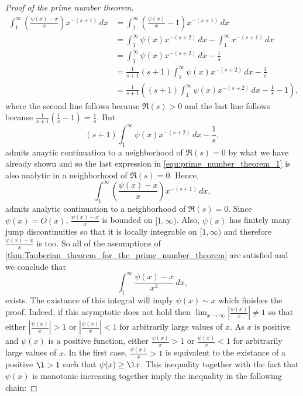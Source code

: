 \begin{proof}[Proof of the prime number theorem]
        \begin{equation}\label{equ:prime_number_theorem_1}
          \begin{aligned}
            \int_{1}^{\infty}\left(\frac{\psi(x)-x}{x}\right)x^{-(s+1)}\,dx &= \int_{1}^{\infty}\left(\frac{\psi(x)}{x}-1\right)x^{-(s+1)}\,dx \\
            &= \int_{1}^{\infty}\psi(x)x^{-(s+2)}\,dx-\int_{1}^{\infty}x^{-(s+1)}\,dx \\
            &= \int_{1}^{\infty}\psi(x)x^{-(s+2)}\,dx-\frac{1}{s} \\
            &= \frac{1}{s+1}(s+1)\int_{1}^{\infty}\psi(x)x^{-(s+2)}\,dx-\frac{1}{s} \\
            &= \frac{1}{s+1}\left((s+1)\int_{1}^{\infty}\psi(x)x^{-(s+2)}\,dx-\frac{1}{s}-1\right),
          \end{aligned}
        \end{equation}
        where the second line follows because $\Re(s) > 0$ and the last line follows because $\frac{1}{s+1}\left(\frac{1}{s}-1\right) = \frac{1}{s}$. But
        \[
          (s+1)\int_{1}^{\infty}\psi(x)x^{-(s+2)}\,dx-\frac{1}{s},
        \]
        admits anaytic continuation to a neighborhood of $\Re(s) = 0$ by what we have already shown and so the last expression in \cref{equ:prime_number_theorem_1} is also analytic in a neighborhood of $\Re(s) = 0$. Hence,
        \[
          \int_{1}^{\infty}\left(\frac{\psi(x)-x}{x}\right)x^{-(s+1)}\,dx,
        \]
        admits analytic continuation to a neighborhood of $\Re(s) = 0$. Since $\psi(x) = O(x)$, $\frac{\psi(x)-x}{x}$ is bounded on $[1,\infty)$. Also, $\psi(x)$ has finitely many jump discontinuities so that it is locally integrable on $[1,\infty)$ and therefore $\frac{\psi(x)-x}{x}$ is too. So all of the assumptions of \cref{thm:Tauberian_theorem_for_the_prime_number_theorem} are satisfied and we conclude that
        \[
          \int_{1}^{\infty}\frac{\psi(x)-x}{x^{2}}\,dx,
        \]
        exists. The existance of this integral will imply $\psi(x) \sim x$ which finishes the proof. Indeed, if this asymptotic does not hold then $\lim_{x \to \infty}\left|\frac{\psi(x)}{x}\right| \neq 1$ so that either $\left|\frac{\psi(x)}{x}\right| > 1$ or $\left|\frac{\psi(x)}{x}\right| < 1$ for arbitrarily large values of $x$. As $x$ is positive and $\psi(x)$ is a positive function, either $\frac{\psi(x)}{x} > 1$ or $\frac{\psi(x)}{x} < 1$ for arbitrarily large values of $x$. In the first case, $\frac{\psi(x)}{x} > 1$ is equivalent to the existance of a positive $\l > 1$ such that $\psi(x) \ge \l x$. This inequality together with the fact that $\psi(x)$ is monotonic increasing together imply the inequality in the following chain:

\end{proof}
